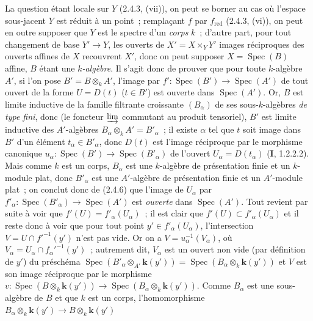 La question étant locale sur $Y$ (2.4.3, (vii)), on peut se borner au cas où
l'espace sous-jacent $Y$ est réduit à un point~; remplaçant $f$ par
$f_{\mathrm{red}}$ (2.4.3, (vi)), on peut en outre supposer que $Y$ est le
spectre d'un \emph{corps} $k$~; d'autre part, pour tout changement de base
$Y'\to Y$, les ouverts de $X'=X\times_Y Y'$ images réciproques des ouverts
affines de $X$ recouvrent $X'$, donc on peut supposer
$X=\operatorname{Spec}(B)$ affine, $B$ étant une \emph{$k$-algèbre}. Il s'agit donc
de prouver que pour toute $k$-algèbre $A'$, si l'on pose
$B'=B\otimes_k A'$, l'image par
$f':\operatorname{Spec}(B')\to\operatorname{Spec}(A')$ de tout ouvert de la
forme $U=D(t)$ ($t\in B'$) est ouverte dans $\operatorname{Spec}(A')$. Or,
$B$ est limite inductive de la famille filtrante croissante $(B_\alpha)$ de
ses sous-$k$-algèbres \emph{de type fini}, donc (le foncteur
$\varinjlim$ commutant au produit tensoriel), $B'$ est limite inductive des
$A'$-algèbres $B_\alpha\otimes_k A'=B'_\alpha$~; il existe $\alpha$ tel que
$t$ soit image dans $B'$ d'un élément $t_\alpha\in B'_\alpha$, donc $D(t)$
est l'image réciproque par le morphisme canonique
$u_\alpha:\operatorname{Spec}(B')\to\operatorname{Spec}(B'_\alpha)$ de
l'ouvert $U_\alpha=D(t_\alpha)$ (\textbf{I}, 1.2.2.2). Mais comme $k$ est un corps,
$B_\alpha$ est une $k$-algèbre de présentation finie et un $k$-module plat,
donc $B'_\alpha$ est une $A'$-algèbre de présentation finie et un $A'$-module
plat~; on conclut donc de (2.4.6) que l'image de $U_\alpha$ par
$f'_\alpha:\operatorname{Spec}(B'_\alpha)\to\operatorname{Spec}(A')$ est
\emph{ouverte} dans $\operatorname{Spec}(A')$. Tout revient par suite à voir
que $f'(U)=f'_\alpha(U_\alpha)$~; il est clair que
$f'(U)\subset f'_\alpha(U_\alpha)$ et il reste donc à voir que pour tout point
$y'\in f'_\alpha(U_\alpha)$, l'intersection
$V=U\cap f'^{-1}(y')$ n'est pas vide. Or on a
$V=u_\alpha^{-1}(V_\alpha)$, où
$V_\alpha=U_\alpha\cap f_\alpha'^{-1}(y')$~; autrement dit, $V_\alpha$ est
un ouvert non vide (par définition de $y'$) du préschéma
$\operatorname{Spec}(B'_\alpha\otimes_{A'}\boldsymbol{k}(y'))
=\operatorname{Spec}(B_\alpha\otimes_k \boldsymbol{k}(y'))$
et $V$ est son image réciproque par le morphisme
$v:\operatorname{Spec}(B\otimes_k \boldsymbol{k}(y'))
\longrightarrow\operatorname{Spec}(B_\alpha\otimes_k \boldsymbol{k}(y'))$.
Comme $B_\alpha$ est une sous-algèbre de $B$ et que $k$ est un corps,
l'homomorphisme
$B_\alpha\otimes_k \boldsymbol{k}(y')\to B\otimes_k \boldsymbol{k}(y')$
